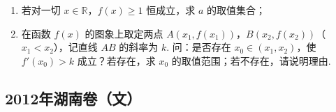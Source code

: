 \begin{description}
\begin{enumerate}[leftmargin=5pt]
\begin{enumerate}
\item 若对一切 \(x\in\mathbb{R}\)，\(f(x)\geqslant1\) 恒成立，求 \(a\) 的取值集合；
\item 在函数 \(f(x)\) 的图象上取定两点 \(A(x_1,f(x_1))\)，\(B(x_2,f(x_2))\)（\(x_1<x_2\)），记直线 \(AB\) 的斜率为 \(k\). 问：是否存在 \(x_0\in(x_1,x_2)\)，使 \(f'(x_0)>k\) 成立？若存在，求 \(x_0\) 的取值范围；若不存在，请说明理由.
\end{enumerate}

    \end{enumerate}

\end{description}


\subsection{2012年湖南卷（文）}\label{gk:2012年湖南卷（文）}

